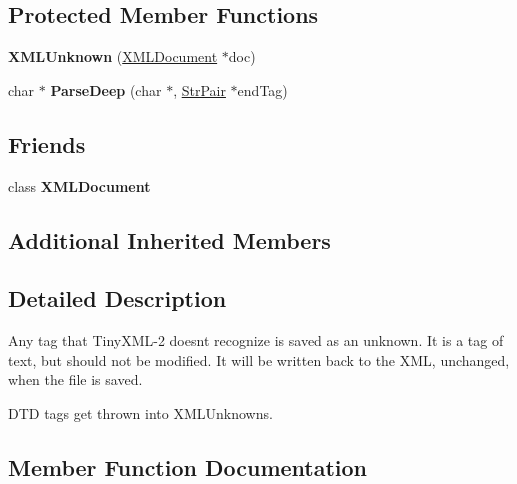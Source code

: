 \subsection*{Protected Member Functions}
\begin{DoxyCompactItemize}
\item 
\hypertarget{classtinyxml2_1_1_x_m_l_unknown_a9391eb679598d50baba424e6f1aa367b}{}{\bfseries X\+M\+L\+Unknown} (\hyperlink{classtinyxml2_1_1_x_m_l_document}{X\+M\+L\+Document} $\ast$doc)\label{classtinyxml2_1_1_x_m_l_unknown_a9391eb679598d50baba424e6f1aa367b}

\item 
\hypertarget{classtinyxml2_1_1_x_m_l_unknown_a0e4f3509dee42a4d45a7f0002be568cc}{}char $\ast$ {\bfseries Parse\+Deep} (char $\ast$, \hyperlink{classtinyxml2_1_1_str_pair}{Str\+Pair} $\ast$end\+Tag)\label{classtinyxml2_1_1_x_m_l_unknown_a0e4f3509dee42a4d45a7f0002be568cc}

\end{DoxyCompactItemize}
\subsection*{Friends}
\begin{DoxyCompactItemize}
\item 
\hypertarget{classtinyxml2_1_1_x_m_l_unknown_a4eee3bda60c60a30e4e8cd4ea91c4c6e}{}class {\bfseries X\+M\+L\+Document}\label{classtinyxml2_1_1_x_m_l_unknown_a4eee3bda60c60a30e4e8cd4ea91c4c6e}

\end{DoxyCompactItemize}
\subsection*{Additional Inherited Members}


\subsection{Detailed Description}
Any tag that Tiny\+X\+M\+L-\/2 doesn\textquotesingle{}t recognize is saved as an unknown. It is a tag of text, but should not be modified. It will be written back to the X\+M\+L, unchanged, when the file is saved.

D\+T\+D tags get thrown into X\+M\+L\+Unknowns. 

\subsection{Member Function Documentation}
\hypertarget{classtinyxml2_1_1_x_m_l_unknown_a0d341ab804a1438a474810bb5bd29dd5}{}
